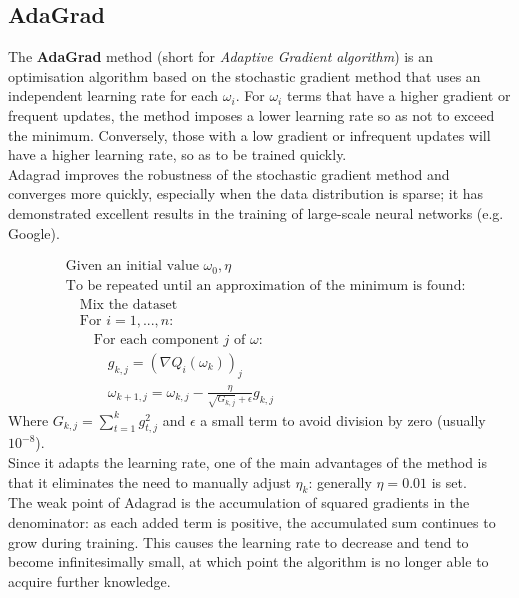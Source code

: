 \newpage
\subsection{AdaGrad \cite{JMLR:v12:duchi11a}}
The \textbf{AdaGrad} method (short for \textit{Adaptive Gradient algorithm}) is an optimisation algorithm based on the stochastic gradient method that uses an independent learning rate for each $\omega_i$. For $\omega_i$ terms that have a higher gradient or frequent updates, the method imposes a lower learning rate so as not to exceed the minimum. Conversely, those with a low gradient or infrequent updates will have a higher learning rate, so as to be trained quickly.\\



Adagrad improves the robustness of the stochastic gradient method and converges more quickly, especially when the data distribution is sparse; it has demonstrated excellent results in the training of large-scale neural networks (e.g. Google).

\begin{align*}
    &\text{Given an initial value }\omega_0, \eta\\
    &\text{To be repeated until an approximation of the minimum is found:}\\
    &\quad\text{Mix the dataset}\\
    &\quad\text{For }i=1,...,n:\\
    &\quad\quad \text{For each component $j$ of $\omega$:}\\
    &\quad\quad\quad g_{k,j}=(\nabla Q_i(\omega_k))_j\\
    &\quad\quad\quad\omega_{k+1,j}=\omega_{k,j} - \frac{\eta}{\sqrt{G_{k,j}}+\epsilon}g_{k,j}
\end{align*}
Where $G_{k,j}=\sum_{t=1}^{k}g_{t,j}^2$ and $\epsilon$ a small term to avoid division by zero (usually $10^{-8}$).\\
Since it adapts the learning rate, one of the main advantages of the method is that it eliminates the need to manually adjust $\eta_k$: generally $\eta=0.01$ is set.\\
The weak point of Adagrad is the accumulation of squared gradients in the denominator: as each added term is positive, the accumulated sum continues to grow during training. This causes the learning rate to decrease and tend to become infinitesimally small, at which point the algorithm is no longer able to acquire further knowledge.


\newpage
